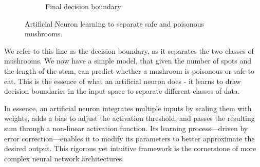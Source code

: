 \documentclass[9pt]{extarticle}
\begin{document}
\begin{figure}[h]
\begin{subfigure}{0.3\textwidth}
        \caption{Final decision boundary}
    \end{subfigure}
    \caption{Artificial Neuron learning to separate safe and poisonous mushrooms.}
\end{figure}
We refer to this line as the decision boundary, as it separates the two classes of mushrooms. We now have a simple model, that given the number of spots and the length of the stem, can predict whether a mushroom is poisonous or safe to eat. This is the essence of what an artificial neuron does - it learns to draw decision boundaries in the input space to separate different classes of data.

In essence, an artificial neuron integrates multiple inputs by scaling them with weights, adds a bias to adjust the activation threshold, and passes the resulting sum through a non-linear activation function. Its learning process—driven by error correction—enables it to modify its parameters to better approximate the desired output. This rigorous yet intuitive framework is the cornerstone of more complex neural network architectures.
\end{document}
